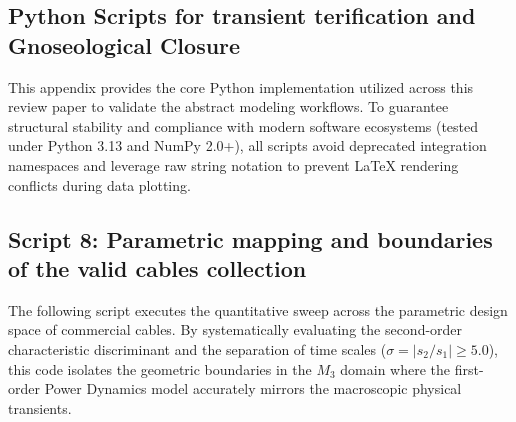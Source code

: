 \documentclass[energies,accept,oneauthor,pdftex]{Definitions/mdpi}
\begin{document}
\subsection*{Python Scripts for transient terification and Gnoseological Closure}
This appendix provides the core Python implementation utilized across this review paper to validate the abstract modeling workflows. To guarantee structural stability and compliance with modern software ecosystems (tested under Python 3.13 and NumPy 2.0+), all scripts avoid deprecated integration namespaces and leverage raw string notation to prevent LaTeX rendering conflicts during data plotting.


\subsection*{Script 8: Parametric mapping and boundaries of the valid cables collection} \label{app:script8}
The following script executes the quantitative sweep across the parametric design space of commercial cables. By systematically evaluating the second-order characteristic discriminant and the separation of time scales ($\sigma = |s_2 / s_1| \ge 5.0$), this code isolates the geometric boundaries in the $M_3$ domain where the first-order Power Dynamics model accurately mirrors the macroscopic physical transients.
\end{document}
